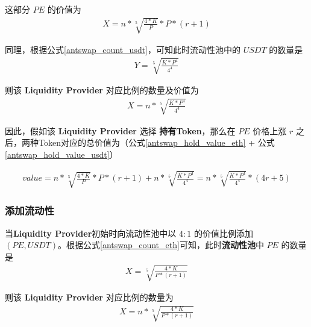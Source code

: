 \documentclass{article}
\begin{document}
这部分 $PE$ 的价值为
\begin{equation} \label{antswap_hold_value_eth}
\begin{split}
X = n * \sqrt[5]{\frac{4*K}{P}} * P * (r + 1)
\end{split}
\end{equation}

同理，根据公式\ref{antswap_count_usdt}，可知此时流动性池中的 $USDT$ 的数量是
\begin{equation*}
\begin{split}
Y = \sqrt[5]{\frac{K * P^4}{4^4}}
\end{split}
\end{equation*}

则该 \textbf{Liquidity Provider} 对应比例的数量及价值为
\begin{equation} \label{antswap_hold_value_usdt}
\begin{split}
X = n * \sqrt[5]{\frac{K * P^4}{4^4}}
\end{split}
\end{equation}

因此，假如该 \textbf{Liquidity Provider} 选择 \textbf{持有Token}，那么在 $PE$ 价格上涨 $r$ 之后，两种Token对应的总价值为（公式\ref{antswap_hold_value_eth} + 公式\ref{antswap_hold_value_usdt}）

\begin{equation} \label{antswap_hold_value}
\begin{split}
value = n * \sqrt[5]{\frac{4*K}{P}} * P * (r + 1) + n * \sqrt[5]{\frac{K * P^4}{4^4}} = n * \sqrt[5]{\frac{K * P^4}{4 ^4}} * (4r + 5)
\end{split}
\end{equation}


\subsubsection*{添加流动性}

当\textbf{Liquidity Provider}初始时向流动性池中以 $4:1$ 的价值比例添加 $(PE, USDT)$。根据公式\ref{antswap_count_eth}可知，此时\textbf{流动性池}中 $PE$ 的数量是
\begin{equation*}
\begin{split}
X = \sqrt[5]{\frac{4*K}{P * (r + 1)}}
\end{split}
\end{equation*}

则该 \textbf{Liquidity Provider} 对应比例的数量为
\begin{equation*}
\begin{split}
X = n * \sqrt[5]{\frac{4*K}{P * (r + 1)}}
\end{split}
\end{equation*}
\end{document}
